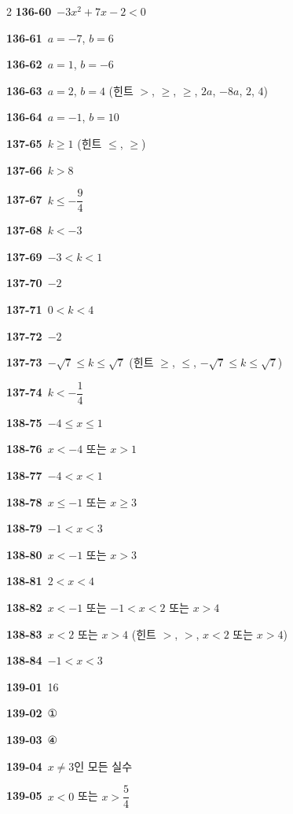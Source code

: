 \documentclass[10pt,a4paper]{article}
\begin{document}
\begin{multicols}{2}
\noindent\textbf{136-60}\ $-3x^2+7x-2<0$\par
\noindent\textbf{136-61}\ $a=-7$, $b=6$\par
\noindent\textbf{136-62}\ $a=1$, $b=-6$\par
\noindent\textbf{136-63}\ $a=2$, $b=4$ (힌트 $>$, $\ge$, $\ge$, $2a$, $-8a$, $2$, $4$)\par
\noindent\textbf{136-64}\ $a=-1$, $b=10$\par
\noindent\textbf{137-65}\ $k\ge 1$ (힌트 $\le$, $\ge$)\par
\noindent\textbf{137-66}\ $k>8$\par
\noindent\textbf{137-67}\ $k\le -\dfrac{9}{4}$\par
\noindent\textbf{137-68}\ $k<-3$\par
\noindent\textbf{137-69}\ $-3<k<1$\par
\noindent\textbf{137-70}\ $-2$\par
\noindent\textbf{137-71}\ $0<k<4$\par
\noindent\textbf{137-72}\ $-2$\par
\noindent\textbf{137-73}\ $-\sqrt{7}\le k\le \sqrt{7}$ (힌트 $\ge$, $\le$, $-\sqrt{7}\le k\le \sqrt{7}$)\par
\noindent\textbf{137-74}\ $k<-\dfrac{1}{4}$\par
\noindent\textbf{138-75}\ $-4\le x\le 1$\par
\noindent\textbf{138-76}\ $x<-4$ 또는 $x>1$\par
\noindent\textbf{138-77}\ $-4<x<1$\par
\noindent\textbf{138-78}\ $x\le -1$ 또는 $x\ge 3$\par
\noindent\textbf{138-79}\ $-1<x<3$\par
\noindent\textbf{138-80}\ $x<-1$ 또는 $x>3$\par
\noindent\textbf{138-81}\ $2<x<4$\par
\noindent\textbf{138-82}\ $x<-1$ 또는 $-1<x<2$ 또는 $x>4$\par
\noindent\textbf{138-83}\ $x<2$ 또는 $x>4$ (힌트 $>$, $>$, $x<2$ 또는 $x>4$)\par
\noindent\textbf{138-84}\ $-1<x<3$\par
\noindent\textbf{139-01}\ 16\par
\noindent\textbf{139-02}\ ①\par
\noindent\textbf{139-03}\ ④\par
\noindent\textbf{139-04}\ $x\ne 3$인 모든 실수\par
\noindent\textbf{139-05}\ $x<0$ 또는 $x>\dfrac{5}{4}$\par

\end{multicols}
\end{document}
